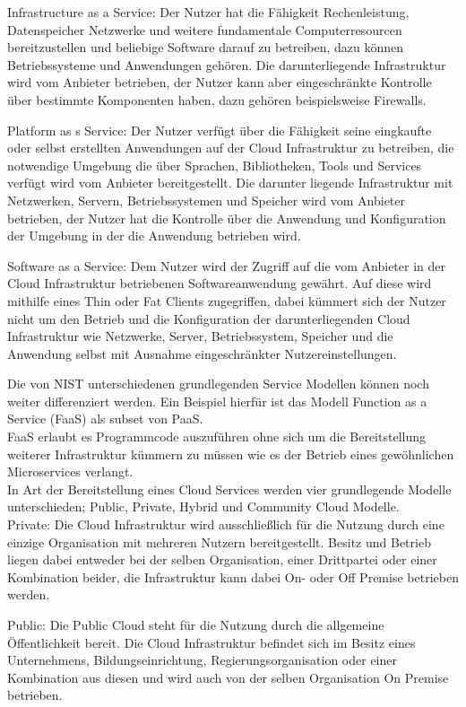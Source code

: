 Infrastructure as a Service: Der Nutzer hat die Fähigkeit Rechenleistung, Datenspeicher
Netzwerke und weitere fundamentale Computerresourcen bereitzustellen und beliebige Software
darauf zu betreiben, dazu können Betriebssysteme und Anwendungen gehören. Die
darunterliegende Infrastruktur wird vom Anbieter betrieben, der Nutzer  kann aber
eingeschränkte Kontrolle über bestimmte Komponenten haben, dazu gehören beispielsweise
Firewalls.

Platform as s Service: Der Nutzer verfügt über die Fähigkeit seine eingkaufte oder
selbst erstellten Anwendungen auf der Cloud Infrastruktur zu betreiben, die notwendige
Umgebung die über Sprachen, Bibliotheken, Tools und Services verfügt wird vom Anbieter
bereitgestellt. Die darunter liegende Infrastruktur mit Netzwerken, Servern,
Betriebssystemen und Speicher wird vom Anbieter betrieben, der Nutzer hat die Kontrolle
über die Anwendung und Konfiguration der Umgebung in der die Anwendung betrieben wird.

Software as a Service: Dem Nutzer wird der Zugriff auf die vom Anbieter in der
Cloud Infrastruktur betriebenen Softwareanwendung gewährt. Auf diese wird mithilfe
eines Thin oder Fat Clients zugegriffen, dabei kümmert sich der Nutzer nicht um den
Betrieb und die Konfiguration der darunterliegenden Cloud Infrastruktur wie
Netzwerke, Server, Betriebssystem, Speicher und die Anwendung selbst mit Ausnahme
eingeschränkter Nutzereinstellungen.

Die von NIST unterschiedenen grundlegenden Service Modellen können noch weiter
differenziert werden.
Ein Beispiel hierfür ist das Modell Function as a Service (FaaS) als subset von PaaS.\\
FaaS erlaubt es Programmcode auszuführen ohne sich um die Bereitstellung weiterer 
Infrastruktur kümmern zu müssen wie es der Betrieb eines gewöhnlichen Microservices
verlangt.\\

In Art der Bereitstellung eines Cloud Services werden vier grundlegende Modelle
unterschieden; Public, Private, Hybrid und Community Cloud Modelle.\\

Private: Die Cloud Infrastruktur wird ausschließlich für die Nutzung durch eine einzige
Organisation mit mehreren Nutzern bereitgestellt. Besitz und Betrieb liegen dabei
entweder bei der selben Organisation, einer Drittpartei oder einer Kombination beider, 
die Infrastruktur kann dabei On- oder Off Premise betrieben werden.

Public: Die Public Cloud steht für die Nutzung durch die allgemeine Öffentlichkeit bereit.
Die Cloud Infrastruktur befindet sich im Besitz eines Unternehmens, Bildungseinrichtung,
Regierungsorganisation oder einer Kombination aus diesen und wird auch von der selben
Organisation On Premise betrieben. 

